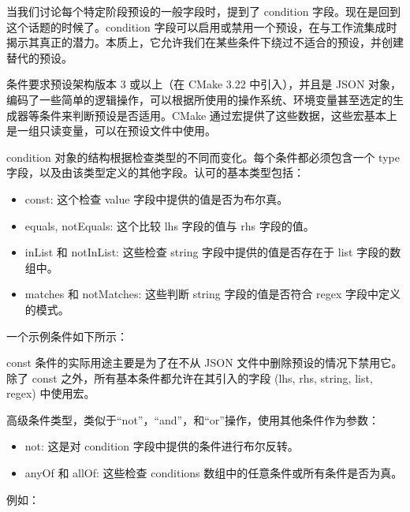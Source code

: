 当我们讨论每个特定阶段预设的一般字段时，提到了 condition 字段。现在是回到这个话题的时候了。condition 字段可以启用或禁用一个预设，在与工作流集成时揭示其真正的潜力。本质上，它允许我们在某些条件下绕过不适合的预设，并创建替代的预设。

条件要求预设架构版本 3 或以上（在 CMake 3.22 中引入），并且是 JSON 对象，编码了一些简单的逻辑操作，可以根据所使用的操作系统、环境变量甚至选定的生成器等条件来判断预设是否适用。CMake 通过宏提供了这些数据，这些宏基本上是一组只读变量，可以在预设文件中使用。

condition 对象的结构根据检查类型的不同而变化。每个条件都必须包含一个 type 字段，以及由该类型定义的其他字段。认可的基本类型包括：

\begin{itemize}
\item
const: 这个检查 value 字段中提供的值是否为布尔真。

\item
equals, notEquals: 这个比较 lhs 字段的值与 rhs 字段的值。

\item
inList 和 notInList: 这些检查 string 字段中提供的值是否存在于 list 字段的数组中。

\item
matches 和 notMatches: 这些判断 string 字段的值是否符合 regex 字段中定义的模式。
\end{itemize}

一个示例条件如下所示：


const 条件的实际用途主要是为了在不从 JSON 文件中删除预设的情况下禁用它。除了 const 之外，所有基本条件都允许在其引入的字段 (lhs, rhs, string, list, regex) 中使用宏。

高级条件类型，类似于“not”，“and”，和“or”操作，使用其他条件作为参数：

\begin{itemize}
\item
not: 这是对 condition 字段中提供的条件进行布尔反转。

\item
anyOf 和 allOf: 这些检查 conditions 数组中的任意条件或所有条件是否为真。
\end{itemize}

例如：



